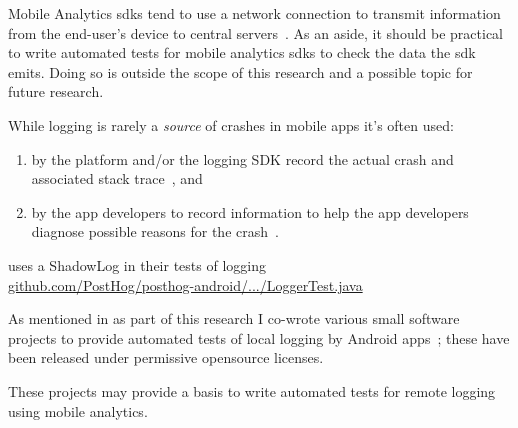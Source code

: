 Mobile Analytics \Gls{sdk}s tend to use a network connection to transmit information from the end-user's device to central servers~. As an aside, it should be practical to write automated tests for mobile analytics \Gls{sdk}s to check the data the \Gls{sdk} emits. Doing so is outside the scope of this research and a possible topic for future research. %

\begin{kaobox}[frametitle=Automated tests for logging]
While logging is rarely a \emph{source} of crashes in mobile apps it's often used: 
\begin{enumerate}[label=(\alph*)]
    \item  by the platform and/or the logging SDK record the actual crash and associated stack trace~, and
    \item by the app developers to record information to help the app developers diagnose possible reasons for the crash~.
\end{enumerate}

 uses a ShadowLog in their tests of logging \\ \href{https://github.com/PostHog/posthog-android/blob/master/posthog/src/test/java/com/posthog/android/LoggerTest.java}{github.com/PostHog/posthog-android/.../LoggerTest.java}

\medskip %

As mentioned in  as part of this research I co-wrote various small software projects to provide automated tests of local logging by Android apps~; these have been released under permissive opensource licenses.

\medskip %

These projects may provide a basis to write automated tests for remote logging using mobile analytics.
\end{kaobox}


